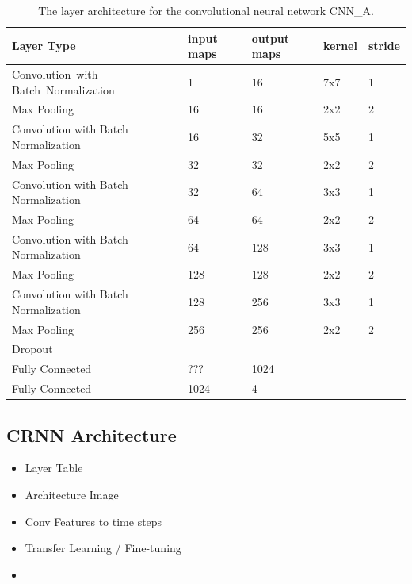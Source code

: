     \begin{table}[h]
  \centering
  \begin{tabularx}{\textwidth}{Xllll}
  \toprule
  Layer Type                       & input maps  & output maps & kernel & stride  \\ \midrule
  \mbox{Convolution with} \mbox{Batch Normalization}  & 1           & 16     & 7x7    & 1       \\ 
  Max Pooling                           & 16          & 16     & 2x2    & 2       \\ 
  Convolution with Batch Normalization  & 16          & 32     & 5x5    & 1       \\ 
  Max Pooling                           & 32          & 32     & 2x2    & 2       \\ 
  Convolution with Batch Normalization  & 32          & 64     & 3x3    & 1       \\ 
  Max Pooling                           & 64          & 64     & 2x2    & 2       \\ 
  Convolution with Batch Normalization  & 64          & 128    & 3x3    & 1       \\ 
  Max Pooling                           & 128         & 128    & 2x2    & 2       \\ 
  Convolution with Batch Normalization  & 128         & 256    & 3x3    & 1       \\ 
  Max Pooling                           & 256         & 256    & 2x2    & 2       \\ 
  Dropout                               &             &        &        &         \\ 
  Fully Connected                       & ???         & 1024   &        &         \\ 
  Fully Connected                       & 1024        & 4      &        &        \\ 
  \bottomrule
  \end{tabularx}
  \caption{The layer architecture for the convolutional neural network CNN\_A.}
  \label{tab:layers_CNN_A}
  \end{table}
    
    

\subsection{CRNN Architecture}

    \begin{itemize}
        \item Layer Table
        \item Architecture Image
        \item Conv Features to time steps
        \item Transfer Learning / Fine-tuning
        \item 
    \end{itemize}
